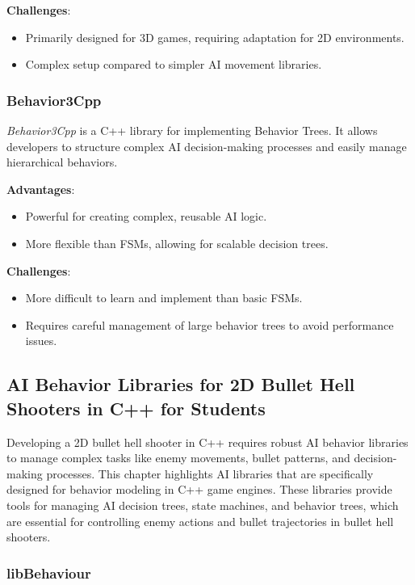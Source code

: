 \documentclass{article} %
\begin{document}
\textbf{Challenges}:
\begin{itemize}
	\item Primarily designed for 3D games, requiring adaptation for 2D environments.
	\item Complex setup compared to simpler AI movement libraries.
\end{itemize}

\subsubsection{Behavior3Cpp}

\textit{Behavior3Cpp} is a C++ library for implementing Behavior Trees. It allows developers to structure complex AI decision-making processes and easily manage hierarchical behaviors.

\textbf{Advantages}:
\begin{itemize}
	\item Powerful for creating complex, reusable AI logic.
	\item More flexible than FSMs, allowing for scalable decision trees.
\end{itemize}

\textbf{Challenges}:
\begin{itemize}
	\item More difficult to learn and implement than basic FSMs.
	\item Requires careful management of large behavior trees to avoid performance issues.
\end{itemize}

\subsection{AI Behavior Libraries for 2D Bullet Hell Shooters in C++ for Students}

Developing a 2D bullet hell shooter in C++ requires robust AI behavior libraries to manage complex tasks like enemy movements, bullet patterns, and decision-making processes. This chapter highlights AI libraries that are specifically designed for behavior modeling in C++ game engines. These libraries provide tools for managing AI decision trees, state machines, and behavior trees, which are essential for controlling enemy actions and bullet trajectories in bullet hell shooters.

\subsubsection{libBehaviour}
\end{document}

